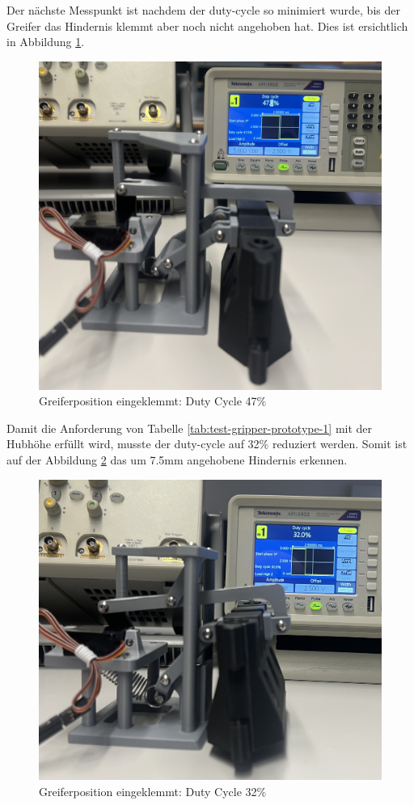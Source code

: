 \newpage

Der nächste Messpunkt ist nachdem der \gls{duty-cycle} so minimiert wurde, bis der Greifer das Hindernis klemmt aber noch nicht angehoben hat. Dies ist ersichtlich in Abbildung \ref{fig: Greiferposition eingeklemmt: Duty Cycle 47}.

\begin{figure}[H]
    \centering
    \includegraphics[width=0.8\linewidth]{img/ServoGreiferKlemmt.jpeg}
    \caption{Greiferposition eingeklemmt: Duty Cycle 47\%}
    \label{fig: Greiferposition eingeklemmt: Duty Cycle 47}
\end{figure}

\newpage

Damit die Anforderung von Tabelle \ref{tab:test-gripper-prototype-1} mit der Hubhöhe erfüllt wird, musste der \gls{duty-cycle} auf 32\% reduziert werden. Somit ist auf der Abbildung \ref{fig: Greiferposition angehoben: Duty Cycle 32} das um 7.5mm angehobene Hindernis erkennen.

\begin{figure}[H]
    \centering
    \includegraphics[width=0.8\linewidth]{img/ServoHindernisAngehoben.jpeg}
    \caption{Greiferposition eingeklemmt: Duty Cycle 32\%}
    \label{fig: Greiferposition angehoben: Duty Cycle 32}
\end{figure}